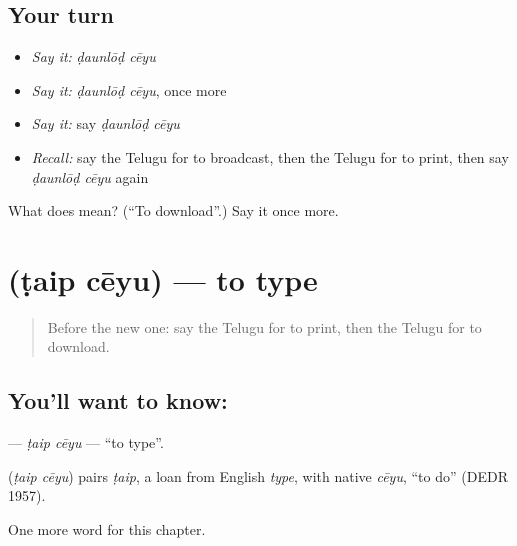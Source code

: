 \subsection*{Your turn}
\begin{itemize}
\raggedright
  \item \emph{Say it:} \emph{ḍaunlōḍ cēyu}
  \item \emph{Say it:} \emph{ḍaunlōḍ cēyu}, once more
  \item \emph{Say it:} say \emph{ḍaunlōḍ cēyu}
  \item \emph{Recall:} say the Telugu for to broadcast, then the Telugu for to print, then say \emph{ḍaunlōḍ cēyu} again
\end{itemize}

\begin{tcolorbox}[breakable,colback=teal!4,colframe=teal!35!black,title={Before you move on}]
What does   mean? (\textquotedblleft{}To download\textquotedblright{}.) Say it once more.
\end{tcolorbox}
\section[\texorpdfstring{\te{టైప్} \te{చేయు} (ṭaip cēyu)}{టైప్ చేయు (ṭaip cēyu)}]{  (ṭaip cēyu) — to type}

\label{lesson:TE-C245-taip-ceyu}



\begin{quote}
Before the new one: say the Telugu for to print, then the Telugu for to download.
\end{quote}

\subsection*{You'll want to know:  }
\textbf{ } — \emph{ṭaip cēyu} — \textquotedblleft{}to type\textquotedblright{}.

\begin{cousinweb}
\textbf{ } (\emph{ṭaip cēyu}) pairs \emph{ṭaip}, a loan from English \emph{type}, with native \emph{cēyu}, \textquotedblleft{}to do\textquotedblright{} (DEDR 1957).
\end{cousinweb}

\begin{grammarlens}[title={What you've built}]
One more word for this chapter.
\end{grammarlens}

